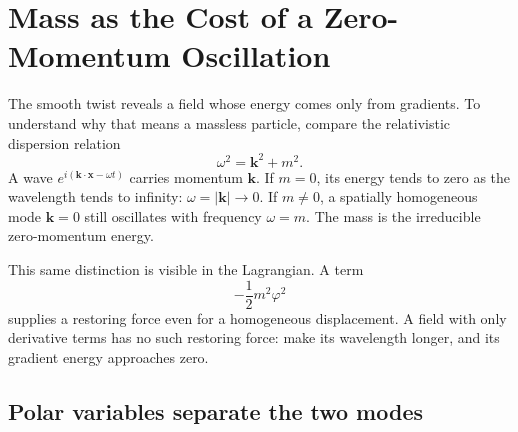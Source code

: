 \begin{classroomqa}
\end{classroomqa}

\section{Mass as the Cost of a Zero-Momentum Oscillation}

The smooth twist reveals a field whose energy comes only from gradients. To
understand why that means a massless particle, compare the relativistic
dispersion relation
\begin{equation}
  \omega^2=\bm{k}^2+m^2.
  \label{eq:l07-dispersion}
\end{equation}
A wave \(e^{i(\bm{k}\cdot\bm{x}-\omega t)}\) carries momentum \(\bm{k}\).
If \(m=0\), its energy tends to zero as the wavelength tends to infinity:
\(\omega=|\bm{k}|\to0\). If \(m\ne0\), a spatially homogeneous mode
\(\bm{k}=0\) still oscillates with frequency \(\omega=m\). The mass is the
irreducible zero-momentum energy.

This same distinction is visible in the Lagrangian. A term
\begin{equation}
  -\frac12m^2\varphi^2
\end{equation}
supplies a restoring force even for a homogeneous displacement. A field with
only derivative terms has no such restoring force: make its wavelength
longer, and its gradient energy approaches zero.

\subsection{Polar variables separate the two modes}

